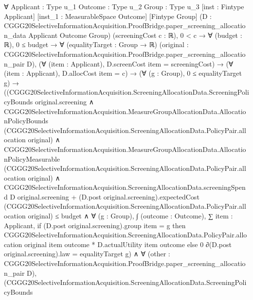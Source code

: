\documentclass[10pt]{article}
\begin{document}
\begin{ReviewVerbatim}
∀ {Applicant : Type u_1} {Outcome : Type u_2} {Group : Type u_3} [inst : Fintype Applicant]
  [inst_1 : MeasurableSpace Outcome] [Fintype Group]
  (D : CGGG20SelectiveInformationAcquisition.ProofBridge.paper_screening_allocation_data Applicant Outcome Group)
  (screeningCost c : ℝ),
  0 < c →
    ∀ (budget : ℝ),
      0 ≤ budget →
        ∀ (equalityTarget : Group → ℝ)
          (original : CGGG20SelectiveInformationAcquisition.ProofBridge.paper_screening_allocation_pair D),
          (∀ (item : Applicant), D.screenCost item = screeningCost) →
            (∀ (item : Applicant), D.allocCost item = c) →
              (∀ (g : Group), 0 ≤ equalityTarget g) →
                ((CGGG20SelectiveInformationAcquisition.ScreeningAllocationData.ScreeningPolicyBounds
                        original.screening ∧
                      CGGG20SelectiveInformationAcquisition.MeasureGroupAllocationData.AllocationPolicyBounds
                          (CGGG20SelectiveInformationAcquisition.ScreeningAllocationData.PolicyPair.allocation
                            original) ∧
                        CGGG20SelectiveInformationAcquisition.MeasureGroupAllocationData.AllocationPolicyMeasurable
                            (CGGG20SelectiveInformationAcquisition.ScreeningAllocationData.PolicyPair.allocation
                              original) ∧
                          CGGG20SelectiveInformationAcquisition.ScreeningAllocationData.screeningSpend D
                                  original.screening +
                                (D.post original.screening).expectedCost
                                  (CGGG20SelectiveInformationAcquisition.ScreeningAllocationData.PolicyPair.allocation
                                    original) ≤
                              budget ∧
                            ∀ (g : Group),
                              ∫ (outcome : Outcome),
                                  ∑ item : Applicant,
                                    if (D.post original.screening).group item = g then
                                      CGGG20SelectiveInformationAcquisition.ScreeningAllocationData.PolicyPair.allocation
                                          original item outcome *
                                        D.actualUtility item outcome
                                    else 0 ∂(D.post original.screening).law =
                                equalityTarget g) ∧
                    ∀ (other : CGGG20SelectiveInformationAcquisition.ProofBridge.paper_screening_allocation_pair D),
                      (CGGG20SelectiveInformationAcquisition.ScreeningAllocationData.ScreeningPolicyBounds

\end{ReviewVerbatim}
\end{document}
